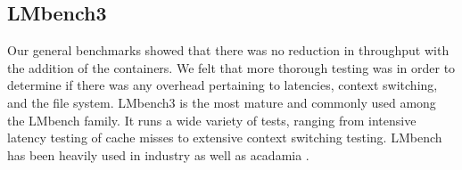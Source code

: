 \subsection{LMbench3}
Our general benchmarks showed that there was no reduction in throughput with the addition of the containers.  We felt that more thorough testing was in order to determine if there was any overhead pertaining to latencies, context switching, and the file system.  LMbench3 is the most mature and commonly used among the LMbench family.  It runs a wide variety of tests, ranging from intensive latency testing of cache misses to extensive context switching testing.  LMbench has been heavily used in industry as well as acadamia \cite{lmbench}.
